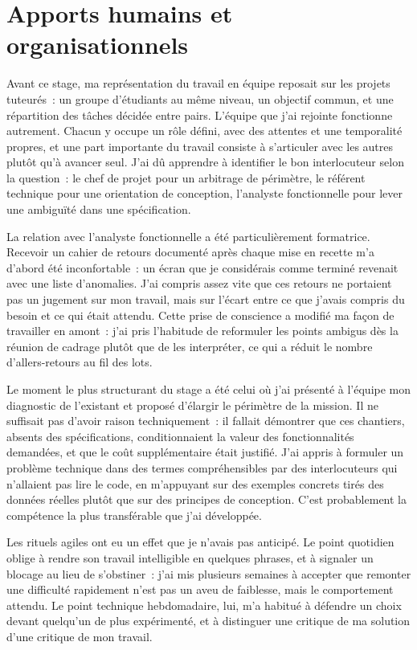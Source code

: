 \section{Apports humains et organisationnels}
\label{sec:apports-humains}

Avant ce stage, ma représentation du travail en équipe reposait sur les projets
tuteurés~: un groupe d'étudiants au même niveau, un objectif commun, et une
répartition des tâches décidée entre pairs. L'équipe que j'ai rejointe
fonctionne autrement. Chacun y occupe un rôle défini, avec des attentes et une
temporalité propres, et une part importante du travail consiste à s'articuler
avec les autres plutôt qu'à avancer seul. J'ai dû apprendre à identifier le bon
interlocuteur selon la question~: le chef de projet pour un arbitrage de
périmètre, le référent technique pour une orientation de conception, l'analyste
fonctionnelle pour lever une ambiguïté dans une spécification.

La relation avec l'analyste fonctionnelle a été particulièrement formatrice.
Recevoir un cahier de retours documenté après chaque mise en recette m'a
d'abord été inconfortable~: un écran que je considérais comme terminé revenait
avec une liste d'anomalies. J'ai compris assez vite que ces retours ne portaient
pas un jugement sur mon travail, mais sur l'écart entre ce que j'avais compris
du besoin et ce qui était attendu. Cette prise de conscience a modifié ma façon
de travailler en amont~: j'ai pris l'habitude de reformuler les points ambigus
dès la réunion de cadrage plutôt que de les interpréter, ce qui a réduit le
nombre d'allers-retours au fil des lots.

Le moment le plus structurant du stage a été celui où j'ai présenté à l'équipe
mon diagnostic de l'existant et proposé d'élargir le périmètre de la mission.
Il ne suffisait pas d'avoir raison techniquement~: il fallait démontrer que ces
chantiers, absents des spécifications, conditionnaient la valeur des
fonctionnalités demandées, et que le coût supplémentaire était justifié. J'ai
appris à formuler un problème technique dans des termes compréhensibles par des
interlocuteurs qui n'allaient pas lire le code, en m'appuyant sur des exemples
concrets tirés des données réelles plutôt que sur des principes de conception.
C'est probablement la compétence la plus transférable que j'ai développée.

Les rituels agiles ont eu un effet que je n'avais pas anticipé. Le point
quotidien oblige à rendre son travail intelligible en quelques phrases, et à
signaler un blocage au lieu de s'obstiner~: j'ai mis plusieurs semaines à
accepter que remonter une difficulté rapidement n'est pas un aveu de faiblesse,
mais le comportement attendu. Le point technique hebdomadaire, lui, m'a habitué
à défendre un choix devant quelqu'un de plus expérimenté, et à distinguer une
critique de ma solution d'une critique de mon travail.

